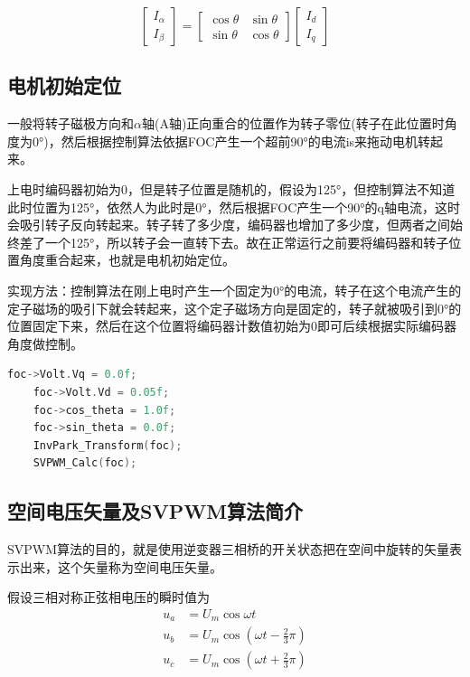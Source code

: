 \documentclass[main.tex]{subfiles}
\begin{document}
\begin{equation}
\begin{bmatrix}
	I_\alpha\\
	I_\beta
\end{bmatrix}
=
\begin{bmatrix}
	\cos\theta & \sin\theta \\
	\sin\theta & \cos\theta
\end{bmatrix}
\begin{bmatrix}
	I_d\\
	I_q
\end{bmatrix}
\label{Rev Park Transform}
\end{equation}

\subsection{电机初始定位}
一般将转子磁极方向和$\alpha$轴(A轴)正向重合的位置作为转子零位(转子在此位置时角度为0°)，然后根据控制算法依据FOC产生一个超前90°的电流is来拖动电机转起来。

上电时编码器初始为0，但是转子位置是随机的，假设为125°，但控制算法不知道此时位置为125°，依然人为此时是0°，然后根据FOC产生一个90°的q轴电流，这时会吸引转子反向转起来。转子转了多少度，编码器也增加了多少度，但两者之间始终差了一个125°，所以转子会一直转下去。故在正常运行之前要将编码器和转子位置角度重合起来，也就是电机初始定位。

实现方法：控制算法在刚上电时产生一个固定为0°的电流，转子在这个电流产生的定子磁场的吸引下就会转起来，这个定子磁场方向是固定的，转子就被吸引到0°的位置固定下来，然后在这个位置将编码器计数值初始为0即可后续根据实际编码器角度做控制。

\begin{lstlisting}[language=C]
    foc->Volt.Vq = 0.0f;
    foc->Volt.Vd = 0.05f;
    foc->cos_theta = 1.0f;
    foc->sin_theta = 0.0f;
    InvPark_Transform(foc);
    SVPWM_Calc(foc);
\end{lstlisting}

\subsection{空间电压矢量及SVPWM算法简介}

SVPWM算法的目的，就是使用逆变器三相桥的开关状态把在空间中旋转的矢量表示出来，这个矢量称为空间电压矢量。

假设三相对称正弦相电压的瞬时值为
\begin{equation}
\begin{aligned}
	u_a &= U_m\cos\omega t \\
	u_b &= U_m\cos(\omega t - \frac{2}{3}\pi) \\
	u_c &= U_m\cos(\omega t + \frac{2}{3}\pi)
\end{aligned}
\end{equation}
\end{document}
